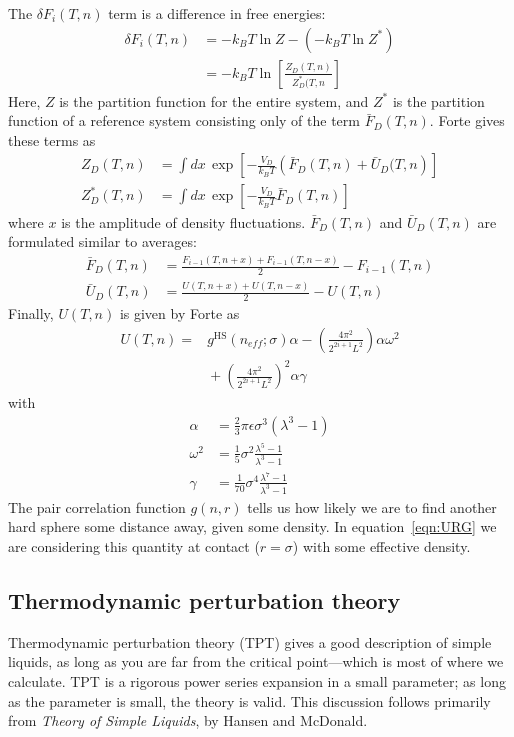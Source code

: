 \documentclass[letterpaper,twocolumn,amsmath,amssymb,prb]{revtex4-1}
\newcommand{\kT}{\ensuremath{k_BT}}
\newcommand{\1}{\ensuremath{\textbf{r}_1}}
\newcommand{\2}{\ensuremath{\textbf{r}_2}}
\newcommand{\3}{\ensuremath{\textbf{r}_3}}
\newcommand{\4}{\ensuremath{\textbf{r}_4}}
\newcommand{\FbarD}{\ensuremath{\bar{F}_D(T,n)}}
\newcommand{\UbarD}{\ensuremath{\bar{U}_D(T,n)}}
\begin{document}
The $\delta F_i(T,n)$ term is a difference in free energies:
\begin{align}
  \delta F_i(T,n) &= -\kT\ln Z - \left( -\kT\ln Z^* \right) \\
  &= -\kT\ln\left[ \frac{Z_D(T,n)}{Z_D^*(T,n} \right]
\end{align}
Here, $Z$ is the partition function for the entire system, and $Z^*$ is the partition function of a reference system consisting only of the term $\FbarD$. Forte gives these terms as
\begin{align}
  Z_D(T,n) &= \int dx\, \exp\left[ -\frac{V_D}{\kT}\left( \FbarD + \bar{U}_D(T,n \right) \right] \\
  Z_D^*(T,n) &= \int dx\, \exp\left[ -\frac{V_D}{\kT}\FbarD \right]
\end{align}
where $x$ is the amplitude of density fluctuations. $\FbarD$ and $\UbarD$ are formulated similar to averages:
\begin{align}
  \FbarD &= \frac{F_{i-1}(T,n+x) + F_{i-1}(T,n-x)}{2} - F_{i-1}(T,n) \\
  \UbarD &= \frac{U(T,n+x) + U(T,n-x)}{2} - U(T,n)
\end{align}
Finally, $U(T,n)$ is given by Forte as
\begin{align}
  U(T,n) = &{} g^\text{HS}(n_{eff};\sigma)\alpha - \left( \frac{4\pi^2}{2^{2i+1}L^2} \right)\alpha\omega^2 \nonumber \\
  &{} + \left( \frac{4\pi^2}{2^{2i+1}L^2} \right)^2\alpha\gamma \label{eqn:URG} %
\end{align}
with
\begin{align}
  \alpha &= \frac{2}{3}\pi\epsilon\sigma^3(\lambda^3 - 1) \\
  \omega^2 &= \frac{1}{5}\sigma^2\frac{\lambda^5 - 1}{\lambda^3 - 1} \\
  \gamma &= \frac{1}{70}\sigma^4\frac{\lambda^7 - 1}{\lambda^3 - 1}
\end{align}
The pair correlation function $g(n,r)$ tells us how likely we are to find another hard sphere some distance away, given some density. In equation~\ref{eqn:URG} we are considering this quantity at contact ($r = \sigma$) with some effective density.

\subsection{Thermodynamic perturbation theory}\label{subsec:TPT}

Thermodynamic perturbation theory (TPT) gives a good description of
simple liquids, as long as you are far from the critical point---which
is most of where we calculate. TPT is a rigorous power series
expansion in a small parameter; as long as the parameter is small, the
theory is valid. This discussion follows primarily from \textit{Theory
  of Simple Liquids}, by Hansen and McDonald\cite{Hansen06}.
\end{document}
